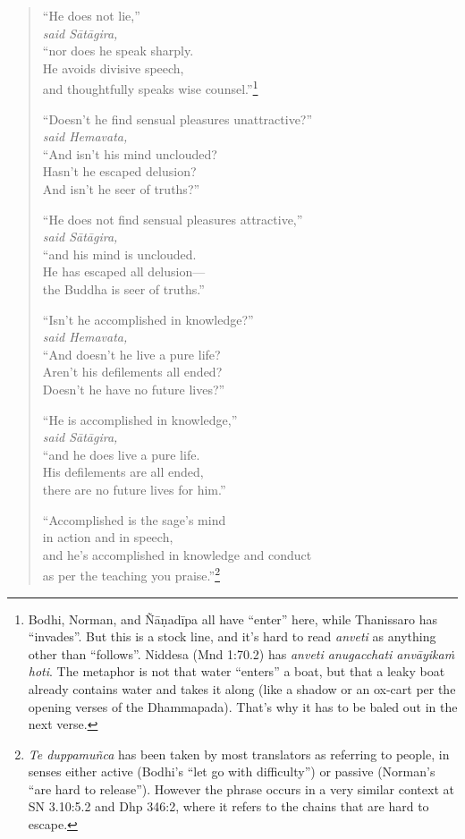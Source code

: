 \documentclass[12pt,openany]{book}%
\newcommand*{\scspeaker}[1]{\hspace{2em}\textit{#1}}
\begin{document}
\begin{verse}
“He does not lie,” \\
\scspeaker{said \textsanskrit{Sātāgira}, }\\
“nor does he speak sharply. \\
He avoids divisive speech, \\
and thoughtfully speaks wise counsel.”\footnote{Bodhi, Norman, and \textsanskrit{Ñāṇadīpa} all have “enter” here, while Thanissaro has “invades”. But this is a stock line, and it’s hard to read \textit{anveti} as anything other than “follows”. Niddesa (Mnd 1:70.2) has \textit{anveti anugacchati \textsanskrit{anvāyikaṁ} hoti}. The metaphor is not that water “enters” a boat, but that a leaky boat already contains water and takes it along (like a shadow or an ox-cart per the opening verses of the Dhammapada). That’s why it has to be baled out in the next verse. } 

“Doesn’t he find sensual pleasures unattractive?” \\
\scspeaker{said Hemavata, }\\
“And isn’t his mind unclouded? \\
Hasn’t he escaped delusion? \\
And isn’t he seer of truths?” 

“He does not find sensual pleasures attractive,” \\
\scspeaker{said \textsanskrit{Sātāgira}, }\\
“and his mind is unclouded. \\
He has escaped all delusion—\\
the Buddha is seer of truths.” 

“Isn’t he accomplished in knowledge?” \\
\scspeaker{said Hemavata, }\\
“And doesn’t he live a pure life? \\
Aren’t his defilements all ended? \\
Doesn’t he have no future lives?” 

“He is accomplished in knowledge,” \\
\scspeaker{said \textsanskrit{Sātāgira}, }\\
“and he does live a pure life. \\
His defilements are all ended, \\
there are no future lives for him.” 

“Accomplished is the sage’s mind \\
in action and in speech, \\
and he’s accomplished in knowledge and conduct \\
as per the teaching you praise.”\footnote{\textit{Te \textsanskrit{duppamuñca}} has been taken by most translators as referring to people, in senses either active (Bodhi’s “let go with difficulty”) or passive (Norman’s “are hard to release”). However the phrase occurs in a very similar context at SN 3.10:5.2 and Dhp 346:2, where it refers to the chains that are hard to escape. } 


\end{verse}
\end{document}
